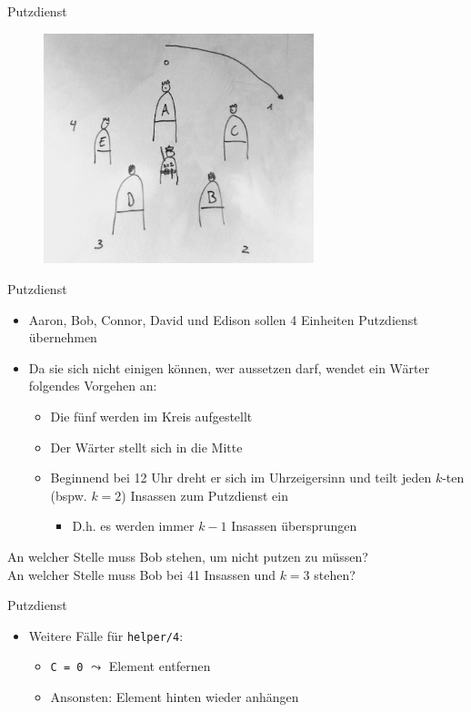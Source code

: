 \documentclass{beamer}
\begin{document}
\begin{frame}{Putzdienst}
	\begin{figure}
		\includegraphics[width=0.7\textwidth]{images/putzdienst}
	\end{figure}
\end{frame}

\begin{frame}{Putzdienst}
	\begin{itemize}
		\item Aaron, Bob, Connor, David und Edison sollen 4 Einheiten Putzdienst übernehmen
		\item Da sie sich nicht einigen können, wer aussetzen darf, wendet ein Wärter folgendes Vorgehen an:
		\begin{itemize}
			\item Die fünf werden im Kreis aufgestellt
			\item Der Wärter stellt sich in die Mitte
			\item Beginnend bei 12 Uhr dreht er sich im Uhrzeigersinn und teilt jeden $k$-ten (bspw. $k = 2$) Insassen zum Putzdienst ein
			\begin{itemize}
				\item D.h. es werden immer $k - 1$ Insassen übersprungen
			\end{itemize}
		\end{itemize}
	\end{itemize}

	An welcher Stelle muss Bob stehen, um nicht putzen zu müssen?\\
	\pause
	An welcher Stelle muss Bob bei 41 Insassen und $k = 3$ stehen?
\end{frame}

\begin{frame}{Putzdienst}

	\begin{itemize}
		\item Weitere Fälle für \texttt{helper/4}:
		\begin{itemize}
			\item \texttt{C = 0} $\leadsto$ Element entfernen
			\item Ansonsten: Element hinten wieder anhängen
		\end{itemize}
	\end{itemize}
\end{frame}
\end{document}
